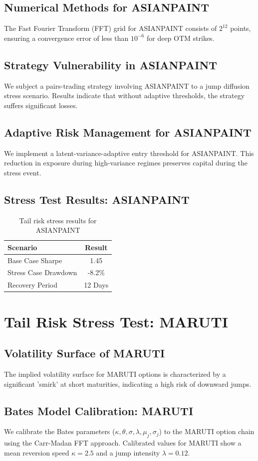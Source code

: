 \documentclass[12pt,a4paper,twoside]{article}
\begin{document}
\subsection{Numerical Methods for ASIANPAINT}
The Fast Fourier Transform (FFT) grid for ASIANPAINT consists of $2^{12}$ points, ensuring a convergence error of less than $10^{-6}$ for deep OTM strikes.
\subsection{Strategy Vulnerability in ASIANPAINT}
We subject a pairs-trading strategy involving ASIANPAINT to a jump diffusion stress scenario. Results indicate that without adaptive thresholds, the strategy suffers significant losses.
\subsection{Adaptive Risk Management for ASIANPAINT}
We implement a latent-variance-adaptive entry threshold for ASIANPAINT. This reduction in exposure during high-variance regimes preserves capital during the stress event.
\subsection{Stress Test Results: ASIANPAINT}
\begin{table}[H]
\centering
\begin{tabular}{|l|c|}
\hline
Scenario & Result \\
\hline
Base Case Sharpe & 1.45 \\
Stress Case Drawdown & -8.2\% \\
Recovery Period & 12 Days \\
\hline
\end{tabular}
\caption{Tail risk stress results for ASIANPAINT}
\end{table}
\newpage

\section{Tail Risk Stress Test: MARUTI}
\subsection{Volatility Surface of MARUTI}
The implied volatility surface for MARUTI options is characterized by a significant 'smirk' at short maturities, indicating a high risk of downward jumps.
\subsection{Bates Model Calibration: MARUTI}
We calibrate the Bates parameters ($\kappa, \theta, \sigma, \lambda, \mu_j, \sigma_j$) to the MARUTI option chain using the Carr-Madan FFT approach.
Calibrated values for MARUTI show a mean reversion speed $\kappa = 2.5$ and a jump intensity $\lambda = 0.12$.
\end{document}
